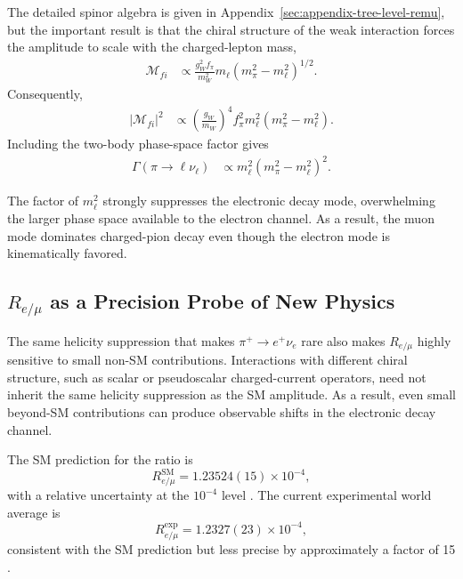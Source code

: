 The detailed spinor algebra is given in
Appendix~\ref{sec:appendix-tree-level-remu}, but the important result is that
the chiral structure of the weak interaction forces the amplitude to scale with
the charged-lepton mass,
\begin{align}
\mathcal{M}_{fi}
&\propto
\frac{g_W^2 f_\pi}{m_W^2}
m_\ell
\left(m_\pi^2-m_\ell^2\right)^{1/2}.
\label{eq:pion-helicity-suppression}
\end{align}
Consequently,
\begin{align}
|\mathcal{M}_{fi}|^2
&\propto
\left(
\frac{g_W}{m_W}
\right)^4
f_\pi^2
m_\ell^2
\left(m_\pi^2-m_\ell^2\right).
\end{align}
Including the two-body phase-space factor gives
\begin{align}
\Gamma(\pi\to\ell\nu_\ell)
&\propto
m_\ell^2
\left(m_\pi^2-m_\ell^2\right)^2 .
\label{eq:pion-rate-scaling}
\end{align}

The factor of \(m_\ell^2\) strongly suppresses the electronic decay mode,
overwhelming the larger phase space available to the electron channel. As a
result, the muon mode dominates charged-pion decay even though the electron mode
is kinematically favored.

\subsection{\texorpdfstring{$R_{e/\mu}$ as a Precision Probe of New Physics}{Re/mu as a Precision Probe of New Physics}}

The same helicity suppression that makes $\pi^{+}\to e^{+}\nu_e$ rare also
makes $R_{e/\mu}$ highly sensitive to small non-SM contributions. Interactions
with different chiral structure, such as scalar or pseudoscalar charged-current
operators, need not inherit the same helicity suppression as the SM amplitude.
As a result, even small beyond-SM contributions can produce observable shifts
in the electronic decay channel.

The SM prediction for the ratio is
\begin{equation}
  R_{e/\mu}^{\mathrm{SM}}
  =
  1.23524(15)\times10^{-4},
  \label{eq:remu-sm-value}
\end{equation}
with a relative uncertainty at the $10^{-4}$ level
\cite{cirigliano_rosell_2007,Bryman:2022hga,pioneer_rare_2022}. The current
experimental world average is
\begin{equation}
  R_{e/\mu}^{\mathrm{exp}}
  =
  1.2327(23)\times10^{-4},
  \label{eq:remu-exp-value}
\end{equation}
consistent with the SM prediction but less precise by approximately a factor of
15 \cite{pienu_2015,pioneer_rare_2022}.

